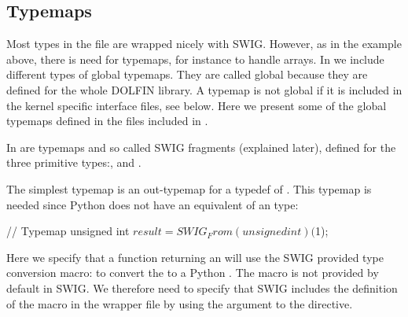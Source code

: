\subsection{Typemaps}

Most types in the  file are wrapped nicely with
SWIG. However, as in the  example above, there is need for
typemaps, for instance to handle \numpy arrays. In  we
include different types of global typemaps. They are called global
because they are defined for the whole DOLFIN library. A typemap is
not global if it is included in the kernel specific interface files,
see below. Here we present some of the global typemaps defined in the
files included in .

In  are typemaps and so called SWIG fragments (explained later), defined
for the three primitive types:,  and
.

The simplest typemap is an out-typemap for  a
typedef of . This typemap is needed since Python
does not have an equivalent of an  type:
\begin{swigcode}
{
  // Typemap unsigned int
  $result = SWIG_From(unsigned int)($1);
}
\end{swigcode}
Here we specify that a function returning an  will
use the SWIG provided type conversion macro:  to convert the  to a Python
. The macro is not provided by default in SWIG. We therefore
need to specify that SWIG includes the definition of the macro in the
wrapper file by using the  argument to the 
directive.

